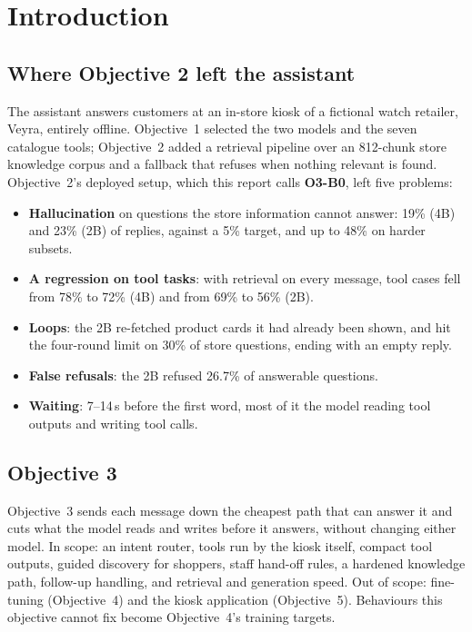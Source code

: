\documentclass[11pt,a4paper]{article}
\begin{document}
\section{Introduction}\label{sec:intro}

\subsection{Where Objective 2 left the assistant}
The assistant answers customers at an in-store kiosk of a fictional watch retailer, Veyra, entirely offline. Objective~1
selected the two models and the seven catalogue tools; Objective~2 added a retrieval pipeline over an 812-chunk store
knowledge corpus and a fallback that refuses when nothing relevant is found. Objective~2's deployed setup, which this
report calls \textbf{O3-B0}, left five problems:
\begin{itemize}
  \item \textbf{Hallucination} on questions the store information cannot answer: 19\% (4B) and 23\% (2B) of replies,
        against a 5\% target, and up to 48\% on harder subsets.
  \item \textbf{A regression on tool tasks}: with retrieval on every message, tool cases fell from 78\% to 72\% (4B) and
        from 69\% to 56\% (2B).
  \item \textbf{Loops}: the 2B re-fetched product cards it had already been shown, and hit the four-round limit on 30\% of
        store questions, ending with an empty reply.
  \item \textbf{False refusals}: the 2B refused 26.7\% of answerable questions.
  \item \textbf{Waiting}: 7--14\,s before the first word, most of it the model reading tool outputs and writing tool calls.
\end{itemize}

\subsection{Objective 3}
Objective~3 sends each message down the cheapest path that can answer it and cuts what the model reads and writes before
it answers, without changing either model. In scope: an intent router, tools run by the kiosk itself, compact tool
outputs, guided discovery for shoppers, staff hand-off rules, a hardened knowledge path, follow-up handling, and
retrieval and generation speed. Out of scope: fine-tuning (Objective~4) and the kiosk application (Objective~5).
Behaviours this objective cannot fix become Objective~4's training targets.
\end{document}
